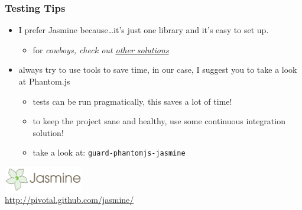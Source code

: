 \documentclass[compress]{beamer}
\begin{document}
\begin{frame}

\frametitle{Testing Tips}

\begin{itemize}[<+->]
  \item I prefer Jasmine because\ldots it's just one library and it's easy to set up.
  \begin{itemize}[<+->]
    \item for \em{cowboys}, check out \href{https://github.com/rwldrn/idiomatic.js/\#test-facility}{other solutions}
  \end{itemize}
  \item always try to use tools to save time, in our case, I suggest you to take a look at Phantom.js
  \begin{itemize}[<+->]
    \item tests can be run pragmatically, this saves a lot of time!
    \item to keep the project sane and healthy, use some continuous integration solution!
    \item take a look at: \texttt{guard-phantomjs-jasmine}
  \end{itemize}
\end{itemize}

\begin{flushright}
  \colorbox{white}{\includegraphics[height=1.1cm]{jasmine.png}}
  \\
  \tiny \url{http://pivotal.github.com/jasmine/}
\end{flushright}


\end{frame}
\end{document}
